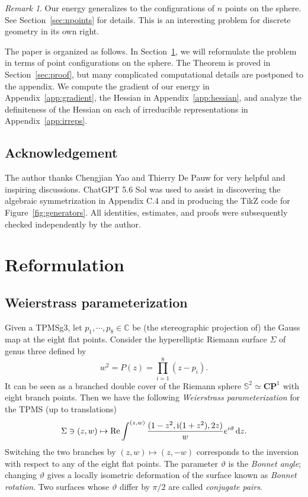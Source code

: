 \documentclass[a4paper]{amsart}
\newcommand{\CP}{\mathbf{CP}}
\newcommand{\uS}{\mathbb{S}}
\newcommand{\re}{\operatorname{Re}}
\newcommand{\ii}{{\rm i}}
\newcommand{\dd}{{\rm d}}
\theoremstyle{plain} %
\theoremstyle{definition} %
\theoremstyle{remark}
\newtheorem{remark}{Remark}
\begin{document}
\begin{remark}
	Our energy generalizes to the configurations of $n$ points on the sphere.
	See Section~\ref{sec:npoints} for details.  This is an interesting problem
	for discrete geometry in its own right.
\end{remark}

The paper is organized as follows.  In Section~\ref{sec:reformulate}, we will
reformulate the problem in terms of point configurations on the sphere.  The
Theorem is proved in Section~\ref{sec:proof}, but many complicated
computational details are postponed to the appendix.  We compute the gradient
of our energy in Appendix~\ref{app:gradient}, the Hessian in
Appendix~\ref{app:hessian}, and analyze the definiteness of the Hessian on each
of irreducible representations in Appendix~\ref{app:irreps}.

\subsection*{Acknowledgement}

The author thanks Chengjian Yao and Thierry De Pauw for very helpful and
inspiring discussions.  ChatGPT 5.6 Sol was used to assist in discovering the
algebraic symmetrization in Appendix C.4 and in producing the TikZ code for
Figure~\ref{fig:generators}. All identities, estimates, and proofs were
subsequently checked independently by the author.

\section{Reformulation}
\label{sec:reformulate}

\subsection{Weierstrass parameterization}

Given a TPMSg3, let $p_1, \cdots, p_8 \in \mathbb{C}$ be (the stereographic
projection of) the Gauss map at the eight flat points.  Consider the
hyperelliptic Riemann surface $\Sigma$ of genus three defined by
\[
	w^2 = P(z) = \prod_{i=1}^8 (z-p_i).
\]
It can be seen as a branched double cover of the Riemann sphere $\uS^2 \simeq
\CP^1$ with eight branch points.  Then we have the following \emph{Weierstrass
parameterization} for the TPMS (up to translations)
\begin{equation}\label{eq:weierstrass}
	\Sigma \ni (z, w) \mapsto \re \int^{(z, w)} \frac{(1-z^2, \ii(1+z^2), 2z)}{w}
	e^{i \vartheta}\, \dd z.
\end{equation}
Switching the two branches by $(z,w) \mapsto (z,-w)$ corresponds to the
inversion with respect to any of the eight flat points.  The parameter
$\vartheta$ is the \emph{Bonnet angle}; changing $\vartheta$ gives a locally
isometric deformation of the surface known as \emph{Bonnet rotation}.  Two
surfaces whose $\vartheta$ differ by $\pi/2$ are called \emph{conjugate pairs}.
\end{document}

